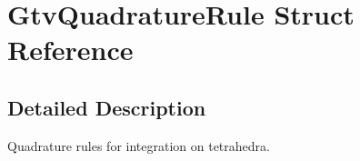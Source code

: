 \section{Gtv\+Quadrature\+Rule Struct Reference}
\label{structGtvQuadratureRule}


\subsection{Detailed Description}
Quadrature rules for integration on tetrahedra. 
